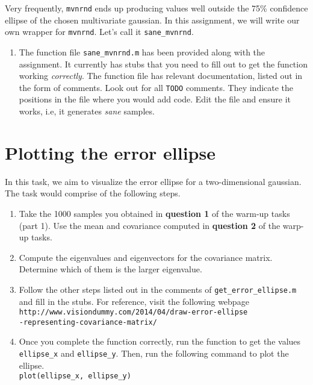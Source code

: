 \documentclass{article}
\begin{document}
Very frequently, \texttt{mvnrnd} ends up producing values well outside the 75\% confidence ellipse of the chosen multivariate gaussian. In this assignment, we will write our own wrapper for \texttt{mvnrnd}. Let's call it \texttt{sane\_mvnrnd}.

\begin{enumerate}
\item The function file \texttt{sane\_mvnrnd.m} has been provided along with the assignment. It currently has stubs that you need to fill out to get the function working \emph{correctly}. The function file has relevant documentation, listed out in the form of comments. Look out for all \texttt{TODO} comments. They indicate the positions in the file where you would add code. Edit the file and ensure it works, i.e, it generates \emph{sane} samples.
\end{enumerate}


\section{Plotting the error ellipse}

In this task, we aim to visualize the error ellipse for a two-dimensional gaussian. The task would comprise of the following steps.

\begin{enumerate}
\item Take the 1000 samples you obtained in \textbf{question 1} of the warm-up tasks (part 1). Use the mean and covariance computed in \textbf{question 2} of the warp-up tasks.
\item Compute the eigenvalues and eigenvectors for the covariance matrix. Determine which of them is the larger eigenvalue.
\item Follow the other steps listed out in the comments of \texttt{get\_error\_ellipse.m} and fill in the stubs. For reference, visit the following webpage \\ \verb|http://www.visiondummy.com/2014/04/draw-error-ellipse|\\\verb|-representing-covariance-matrix/|
\item Once you complete the function correctly, run the function to get the values \texttt{ellipse\_x} and \texttt{ellipse\_y}. Then, run the following command to plot the ellipse. \\
\texttt{plot(ellipse\_x, ellipse\_y)}
\end{enumerate}
\end{document}
